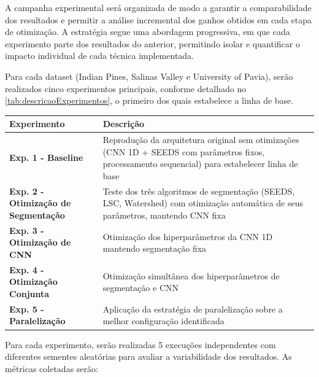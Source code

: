 A campanha experimental será organizada de modo a garantir a comparabilidade dos resultados e permitir a análise incremental dos ganhos obtidos em cada etapa de otimização. A estratégia segue uma abordagem progressiva, em que cada experimento parte dos resultados do anterior, permitindo isolar e quantificar o impacto individual de cada técnica implementada.

Para cada dataset (Indian Pines, Salinas Valley e University of Pavia), serão realizados cinco experimentos principais, conforme detalhado no \autoref{tab:descricaoExperimentos}, o primeiro dos quais estabelece a linha de base.


\begin{quadro}[H]
    \centering
    \caption{Descrição detalhada dos experimentos}
    \begin{tabular}{|p{}|p{}|}
        \hline
        \rowcolor[HTML]{C0C0C0}
        \textbf{Experimento} & \textbf{Descrição} \\
        \hline
        
        \textbf{Exp. 1 - Baseline} & Reprodução da arquitetura original sem otimizações (CNN 1D + SEEDS com parâmetros fixos, processamento sequencial) para estabelecer linha de base \\
        \hline
        
        \textbf{Exp. 2 - Otimização de Segmentação} & Teste dos três algoritmos de segmentação (SEEDS, LSC, Watershed) com otimização automática de seus parâmetros, mantendo CNN fixa \\
        \hline
        
        \textbf{Exp. 3 - Otimização de CNN} & Otimização dos hiperparâmetros da CNN 1D mantendo segmentação fixa \\
        \hline
        
        \textbf{Exp. 4 - Otimização Conjunta} & Otimização simultânea dos hiperparâmetros de segmentação e CNN \\
        \hline
        
        \textbf{Exp. 5 - Paralelização} & Aplicação da estratégia de paralelização sobre a melhor configuração identificada \\
        \hline
    \end{tabular}
    \label{tab:descricaoExperimentos}
\end{quadro}

Para cada experimento, serão realizadas 5 execuções independentes com diferentes sementes aleatórias para avaliar a variabilidade dos resultados. As métricas coletadas serão:

